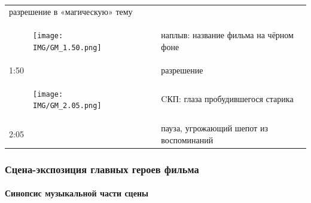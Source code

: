 \begin{longtable}[]{@{}ll@{}}
\begin{minipage}[t]{0.55\columnwidth}
разрешение в «магическую» тему\strut
\end{minipage}\tabularnewline
\begin{minipage}[t]{0.30\columnwidth}\raggedright\strut
\begin{figure}
\centering
\texttt{[image: IMG/GM\_1.50.png]}
\caption{}
\end{figure}
\strut
\end{minipage} & \begin{minipage}[t]{0.55\columnwidth}\raggedright\strut
наплыв: название фильма на чёрном фоне\strut
\end{minipage}\tabularnewline
\begin{minipage}[t]{0.30\columnwidth}\raggedright\strut
1:50\strut
\end{minipage} & \begin{minipage}[t]{0.55\columnwidth}\raggedright\strut
разрешение\strut
\end{minipage}\tabularnewline
\begin{minipage}[t]{0.30\columnwidth}\raggedright\strut
\begin{figure}
\centering
\texttt{[image: IMG/GM\_2.05.png]}
\caption{}
\end{figure}
\strut
\end{minipage} & \begin{minipage}[t]{0.55\columnwidth}\raggedright\strut
CКП: глаза пробудившегося старика\strut
\end{minipage}\tabularnewline
\begin{minipage}[t]{0.30\columnwidth}\raggedright\strut
2:05\strut
\end{minipage} & \begin{minipage}[t]{0.55\columnwidth}\raggedright\strut
пауза, угрожающий шепот из воспоминаний\strut
\end{minipage}\tabularnewline
\bottomrule
\end{longtable}

\subsubsection{Сцена-экспозиция главных героев фильма}\label{ux441ux446ux435ux43dux430-ux44dux43aux441ux43fux43eux437ux438ux446ux438ux44f-ux433ux43bux430ux432ux43dux44bux445-ux433ux435ux440ux43eux435ux432-ux444ux438ux43bux44cux43cux430}

\paragraph{Синопсис музыкальной части сцены}\label{ux441ux438ux43dux43eux43fux441ux438ux441-ux43cux443ux437ux44bux43aux430ux43bux44cux43dux43eux439-ux447ux430ux441ux442ux438-ux441ux446ux435ux43dux44b}

